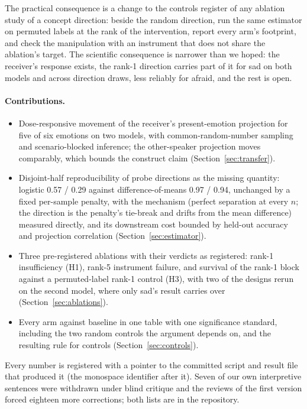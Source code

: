 \documentclass[11pt]{article}
\begin{document}
The practical consequence is a change to the controls register of any ablation study of a concept direction: beside the random direction, run the same estimator on permuted labels at the rank of the intervention, report every arm's footprint, and check the manipulation with an instrument that does not share the ablation's target. The scientific consequence is narrower than we hoped: the receiver's response exists, the rank-1 direction carries part of it for sad on both models and across direction draws, less reliably for afraid, and the rest is open.

\paragraph{Contributions.}
\begin{itemize}\setlength\itemsep{1pt}
\item Dose-responsive movement of the receiver's present-emotion projection for five of six emotions on two models, with common-random-number sampling and scenario-blocked inference; the other-speaker projection moves comparably, which bounds the construct claim (Section~\ref{sec:transfer}).
\item Disjoint-half reproducibility of probe directions as the missing quantity: logistic 0.57 / 0.29 against difference-of-means 0.97 / 0.94, unchanged by a fixed per-sample penalty, with the mechanism (perfect separation at every $n$; the direction is the penalty's tie-break and drifts from the mean difference) measured directly, and its downstream cost bounded by held-out accuracy and projection correlation (Section~\ref{sec:estimator}).
\item Three pre-registered ablations with their verdicts as registered: rank-1 insufficiency (H1), rank-5 instrument failure, and survival of the rank-1 block against a permuted-label rank-1 control (H3), with two of the designs rerun on the second model, where only sad's result carries over (Section~\ref{sec:ablations}).
\item Every arm against baseline in one table with one significance standard, including the two random controls the argument depends on, and the resulting rule for controls (Section~\ref{sec:controls}).
\end{itemize}
Every number is registered with a pointer to the committed script and result file that produced it (the monospace identifier after it). Seven of our own interpretive sentences were withdrawn under blind critique and the reviews of the first version forced eighteen more corrections; both lists are in the repository.
\end{document}
